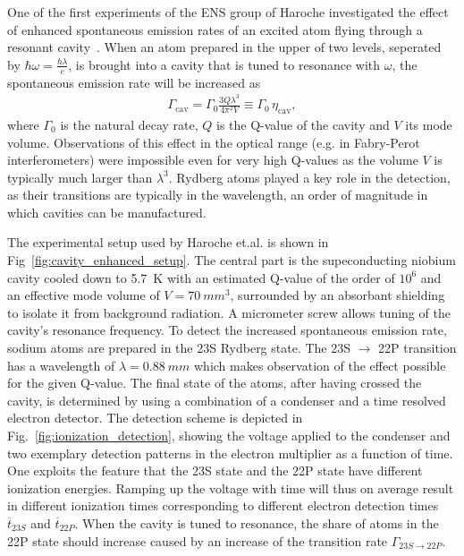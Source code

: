 One of the first experiments of the ENS group of Haroche investigated the effect
of enhanced spontaneous emission rates of an excited atom flying through a
resonant cavity~\cite{haroche1983EnhancedSpontEm}. When an atom prepared in
the upper of two levels, seperated by $\hbar \omega=\frac{h\lambda}{c}$, is brought into a cavity
that is tuned to resonance with $\omega$, the spontaneous emission rate will
be increased as
\begin{align}
  \label{eq:enh_spont_em_rate}
  \Gamma_{\text{cav}} = \Gamma_0 \frac{3Q\lambda^3}{4\pi^2 V} \equiv
  \Gamma_0\,\eta_{\text{cav}},
\end{align}
where $\Gamma_0$ is the natural decay rate, $Q$ is the Q-value of the cavity and
$V$ its mode volume. Observations of this effect in the optical range (e.g. in
Fabry-Perot interferometers) were impossible even for very high Q-values as the
volume $V$ is typically much larger than $\lambda^3$. Rydberg atoms played a key
role in the detection, as their transitions are typically in the 
wavelength, an order of magnitude in which cavities can be manufactured.

The experimental setup used by Haroche et.al. is shown in
Fig~\ref{fig:cavity_enhanced_setup}. The central part is the supeconducting
niobium cavity cooled down to \SI{5.7}{K} with an estimated Q-value of the order
of $10^6$ and an effective mode volume of $V=\SI{70}{mm^3}$, surrounded by an absorbant
shielding to isolate it from background radiation. A micrometer screw allows
tuning of the cavity's resonance frequency. To detect the increased spontaneous
emission rate, sodium atoms are prepared in the 23S Rydberg state. The
23S $\rightarrow$ 22P transition has a wavelength of $\lambda=\SI{0.88}{mm}$
which makes observation of the effect possible for the given Q-value. The final
state of the atoms, after having crossed the cavity, is determined by using a
combination of a condenser and a time resolved electron detector. The detection
scheme is depicted in Fig.~\ref{fig:ionization_detection}, showing the voltage
applied to the condenser and two exemplary detection patterns in the electron
multiplier as a function of time. One exploits the feature that the 23S state
and the 22P state have different ionization energies. Ramping up the voltage
with time will thus on average result in different ionization times
corresponding to different electron detection times $\overline{t}_{23S}$ and
$\overline{t}_{22P}$. When the cavity is tuned to resonance, the share of atoms
in the 22P state should increase caused by an increase of the transition rate
$\Gamma_{23S \rightarrow 22P}$.


